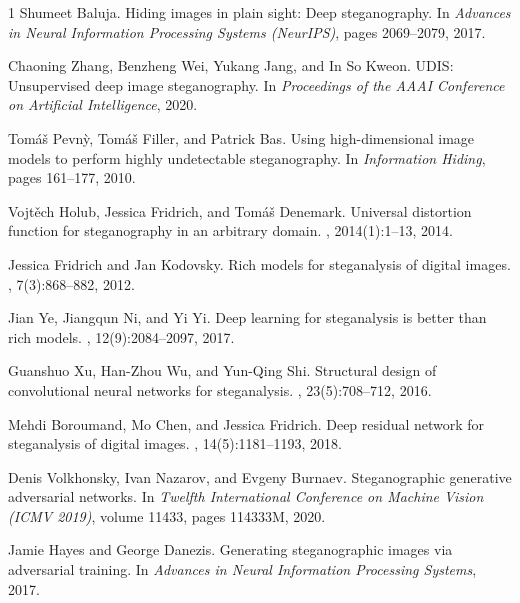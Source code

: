 \documentclass[10pt,twocolumn,letterpaper]{article}
\begin{document}
{\begin{thebibliography}{1}
    Shumeet Baluja.
    \newblock Hiding images in plain sight: Deep steganography.
    \newblock In {\em Advances in Neural Information Processing Systems (NeurIPS)}, pages 2069--2079, 2017.

    Chaoning Zhang, Benzheng Wei, Yukang Jang, and In So Kweon.
    \newblock UDIS: Unsupervised deep image steganography.
    \newblock In {\em Proceedings of the AAAI Conference on Artificial Intelligence}, 2020.

    Tom{\'a}{\v{s}} Pevn{\`y}, Tom{\'a}{\v{s}} Filler, and Patrick Bas.
    \newblock Using high-dimensional image models to perform highly undetectable steganography.
    \newblock In {\em Information Hiding}, pages 161--177, 2010.

    Vojt{\v{e}}ch Holub, Jessica Fridrich, and Tom{\'a}{\v{s}} Denemark.
    \newblock Universal distortion function for steganography in an arbitrary domain.
    , 2014(1):1--13, 2014.

    Jessica Fridrich and Jan Kodovsky.
    \newblock Rich models for steganalysis of digital images.
    , 7(3):868--882, 2012.

    Jian Ye, Jiangqun Ni, and Yi Yi.
    \newblock Deep learning for steganalysis is better than rich models.
    , 12(9):2084--2097, 2017.

    Guanshuo Xu, Han-Zhou Wu, and Yun-Qing Shi.
    \newblock Structural design of convolutional neural networks for steganalysis.
    , 23(5):708--712, 2016.

    Mehdi Boroumand, Mo Chen, and Jessica Fridrich.
    \newblock Deep residual network for steganalysis of digital images.
    , 14(5):1181--1193, 2018.

    Denis Volkhonsky, Ivan Nazarov, and Evgeny Burnaev.
    \newblock Steganographic generative adversarial networks.
    \newblock In {\em Twelfth International Conference on Machine Vision (ICMV 2019)}, volume 11433, pages 114333M, 2020.

    Jamie Hayes and George Danezis.
    \newblock Generating steganographic images via adversarial training.
    \newblock In {\em Advances in Neural Information Processing Systems}, 2017.


\end{thebibliography}}
\end{document}
